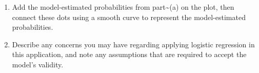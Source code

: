 \documentclass[
]{article}
\providecommand{\tightlist}{%
  \setlength{\itemsep}{0pt}\setlength{\parskip}{0pt}}
\begin{document}
\begin{enumerate}
\def\labelenumi{(\alph{enumi})}
\setcounter{enumi}{1}
\tightlist
\item
  Add the model-estimated probabilities from part\textasciitilde(a) on
  the plot, then connect these dots using a smooth curve to represent
  the model-estimated probabilities.
\item
  Describe any concerns you may have regarding applying logistic
  regression in this application, and note any assumptions that are
  required to accept the model's validity.
\end{enumerate}
\end{document}
